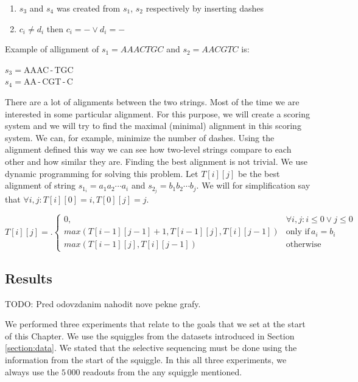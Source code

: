 \begin{enumerate}
\item $s_3$ and $s_4$ was created from $s_1$, $s_2$ respectively by inserting dashes
\item $c_i \neq d_i$ then $c_i = - \lor d_i = -$
\end{enumerate}

Example of allignment of $s_1 = AAACTGC$ and $s_2 = AACGTC$ is:

\begin{center}
$s_3 = $AAAC\,-\,TGC\\
$s_4 = $AA\,-\,CGT\,-\,C
\end{center}

There are a lot of alignments between the two strings. Most of the time we
are interested in some particular alignment. For this purpose, we will create a
scoring system and we will try to find the maximal (minimal) alignment in this scoring
system. We can, for example, minimize the number of dashes. Using the alignment
defined this way we can see how two-level strings compare to each other and how similar they are.
Finding the best alignment is not trivial. We use dynamic programming for
solving this problem. Let $T[i][j]$ be the best alignment of string $s_{1_i} = a_1a_2\cdots a_i$
and $s_{2_j} = b_1b_2\cdots b_j$. We will for simplification say that $\forall i, j: T[i][0] = i, T[0][j] = j$.

\[
T[i][j] = \bigl.
  \begin{cases}
    0, & \forall i,j : i\leq 0 \lor j\leq 0 \\
    max(T[i-1][j-1] + 1, T[i-1][j], T[i][j-1]) & \text{only if} \, a_i = b_i \\ 
    max(T[i-1][j], T[i][j-1]) & \text{otherwise}
  \end{cases}
\]

\subsection{Results}
\label{section:results}

TODO: Pred odovzdanim nahodit nove pekne grafy.

We performed three experiments that relate to the goals that we set at the start
of this Chapter. We use the squiggles from the datasets introduced in Section
\ref{section:data}. We stated that the selective sequencing must be done using
the information from the start of the squiggle. In this all three experiments, we always use
the $5\,000$ readouts from the any squiggle mentioned. 

